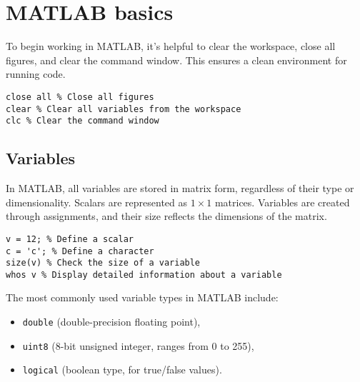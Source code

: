 \section{MATLAB basics}

To begin working in MATLAB, it's helpful to clear the workspace, close all figures, and clear the command window. 
This ensures a clean environment for running code.
\begin{lstlisting}[style=MATLAB] 
close all % Close all figures 
clear % Clear all variables from the workspace 
clc % Clear the command window 
\end{lstlisting}

\subsection{Variables}
In MATLAB, all variables are stored in matrix form, regardless of their type or dimensionality. 
Scalars are represented as $1\times 1$ matrices. 
Variables are created through assignments, and their size reflects the dimensions of the matrix.
\begin{lstlisting}[style=MATLAB] 
v = 12; % Define a scalar 
c = 'c'; % Define a character 
size(v) % Check the size of a variable 
whos v % Display detailed information about a variable 
\end{lstlisting}
The most commonly used variable types in MATLAB include:
\begin{itemize}
    \item \texttt{double} (double-precision floating point),
    \item \texttt{uint8} (8-bit unsigned integer, ranges from 0 to 255),
    \item \texttt{logical} (boolean type, for true/false values).
\end{itemize}


